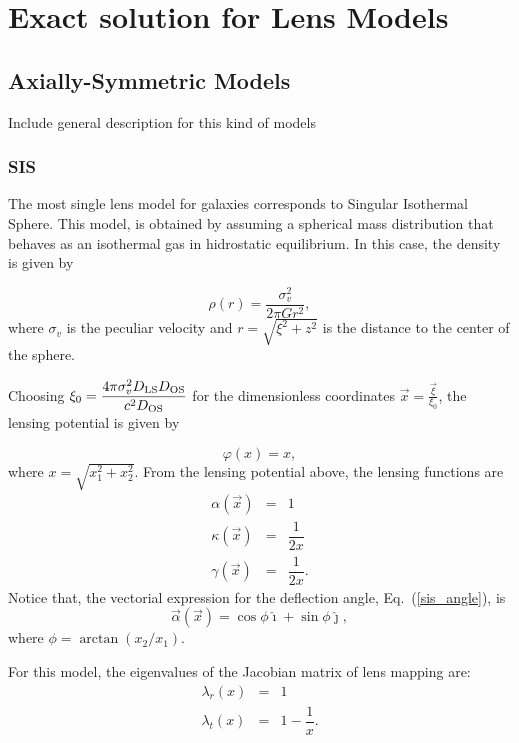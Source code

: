 \chapter{Exact solution for Lens Models}

\section{Axially-Symmetric Models}

Include general description for this kind of models

\subsection{SIS}
The most single lens model for galaxies  corresponds to Singular Isothermal
Sphere. This model, is obtained by assuming a spherical mass distribution
that behaves as an isothermal gas in hidrostatic equilibrium. In this case,
the density is given by

\begin{equation}
 \rho(r)=\dfrac{\sigma_v^2}{2\pi G r^2},
\end{equation}
where $\sigma_v$ is the peculiar velocity  and $r=\sqrt{\xi^2+z^2}$ is the
distance to the center of the sphere. 

Choosing $\xi_0= \dfrac{4\pi \sigma^2_v D_{\rm LS} D_{\rm OS}}{c^2 D_{\rm
OS}}$ for the dimensionless coordinates $\vec{x}=\frac{\vec{\xi}}{\xi_0}$, the
lensing potential is given by

\begin{equation}
 \varphi(x)=x,
\label{sis_pot}
\end{equation}
where $x=\sqrt{x^2_1+x^2_2}$. From the lensing potential above, the lensing
functions are
\begin{eqnarray}
 \alpha(\vec{x}) &=& 1 \label{sis_angle}\\
\kappa(\vec{x}) &= & \dfrac{1}{2x} \label{sis_convg}\\
\gamma(\vec{x}) & = &  \dfrac{1}{2x} \label{sis_shear}.
\end{eqnarray}
Notice that, the vectorial expression for the deflection angle,
Eq.~(\ref{sis_angle}), is
\begin{equation}
 \vec{\alpha}(\vec{x})=\cos{\phi}\hat{\imath} + \sin{\phi}\hat{\jmath},
\end{equation}
where $\phi=\arctan{(x_2/x_1)}$.

For this model, the eigenvalues of the Jacobian matrix of lens mapping are:
\begin{eqnarray}
\lambda_r(x)&=&1 \label{lr_sis}\\
\lambda_t(x)&=&1-\dfrac{1}{x} \label{lt_sis}.
\end{eqnarray}

